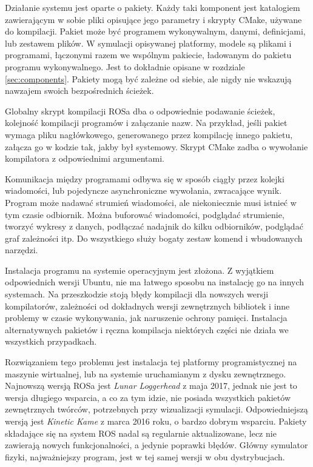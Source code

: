 		Działanie systemu jest oparte o pakiety.
		Każdy taki komponent jest katalogiem zawierającym w sobie pliki opisujące jego parametry i skrypty CMake, używane do kompilacji.
		Pakiet może być programem wykonywalnym, danymi, definicjami, lub zestawem plików.
		W symulacji opisywanej platformy, modele są plikami i programami, łączonymi razem we wspólnym pakiecie, ładowanym do pakietu programu wykonywalnego.
		Jest to dokładnie opisane w rozdziale \ref{sec:components}.
		Pakiety mogą być zależne od siebie, ale nigdy nie wskazują nawzajem swoich bezpośrednich ścieżek.

		Globalny skrypt kompilacji ROSa dba o odpowiednie podawanie ścieżek, kolejność kompilacji programów i załączanie nazw.
		Na przykład, jeśli pakiet wymaga pliku nagłówkowego, generowanego przez kompilację innego pakietu, załącza go w kodzie tak, jakby był systemowy.
		Skrypt CMake zadba o wywołanie kompilatora z odpowiednimi argumentami.

		Komunikacja między programami odbywa się w sposób ciągły przez kolejki wiadomości, lub pojedyncze asynchroniczne wywołania, zwracające wynik.
		Program może nadawać strumień wiadomości, ale niekoniecznie musi istnieć w tym czasie odbiornik.
		Można buforować wiadomości, podglądać strumienie, tworzyć wykresy z danych, podłączać nadajnik do kilku odbiorników, podglądać graf zależności itp.
		Do wszystkiego służy bogaty zestaw komend i wbudowanych narzędzi.

		Instalacja programu na systemie operacyjnym jest złożona.
		Z wyjątkiem odpowiednich wersji Ubuntu, nie ma łatwego sposobu na instalację go na innych systemach.
		Na przeszkodzie stoją błędy kompilacji dla nowszych wersji kompilatorów, zależności od dokładnych wersji zewnętrznych bibliotek i 
		inne problemy w czasie wykonywania, jak naruszenie ochrony pamięci. 
		Instalacja alternatywnych pakietów i ręczna kompilacja niektórych części nie działa we wszystkich przypadkach.

		Rozwiązaniem tego problemu jest instalacja tej platformy programistycznej na maszynie wirtualnej, lub na systemie uruchamianym z dysku zewnętrznego. 
		Najnowszą wersją ROSa jest \emph{Lunar Loggerhead} z maja 2017, jednak nie jest to wersja długiego wsparcia, a co za tym idzie, nie posiada wszystkich
		pakietów zewnętrznych twórców, potrzebnych przy wizualizacji symulacji.
		Odpowiedniejszą wersją jest \emph{Kinetic Kame} z marca 2016 roku, o bardzo dobrym wsparciu.
		Pakiety składające się na system ROS nadal są regularnie aktualizowane, lecz nie zawierają nowych funkcjonalności, a jedynie poprawki błędów.
		Główny symulator fizyki, najważniejszy program, jest w tej samej wersji w obu dystrybucjach.

